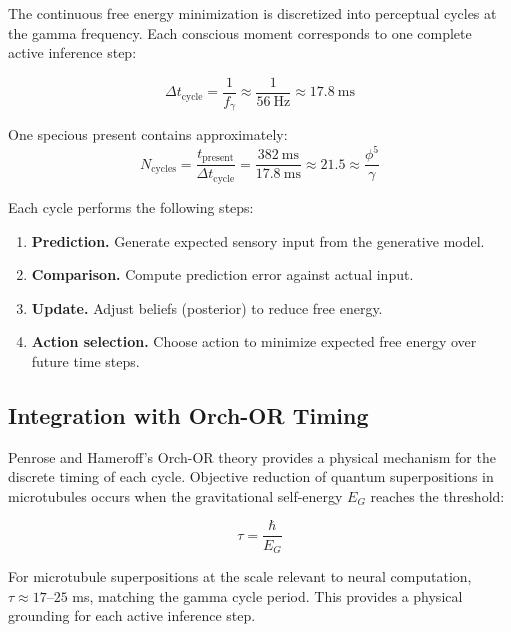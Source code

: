 \documentclass[12pt,a4paper]{article}
\begin{document}
The continuous free energy minimization is discretized into perceptual cycles
at the gamma frequency. Each conscious moment corresponds to one complete
active inference step:

\begin{equation}
\Delta t_{\mathrm{cycle}} = \frac{1}{f_\gamma} \approx \frac{1}{56~\text{Hz}}
\approx 17.8~\text{ms}
\end{equation}

\noindent
One specious present contains approximately:
\begin{equation}
N_{\mathrm{cycles}} = \frac{t_{\mathrm{present}}}{\Delta t_{\mathrm{cycle}}}
= \frac{382~\text{ms}}{17.8~\text{ms}} \approx 21.5 \approx \frac{\phi^5}{\gamma}
\end{equation}

\noindent
Each cycle performs the following steps:
\begin{enumerate}[leftmargin=2em]
  \item \textbf{Prediction.} Generate expected sensory input from the
    generative model.
  \item \textbf{Comparison.} Compute prediction error against actual input.
  \item \textbf{Update.} Adjust beliefs (posterior) to reduce free energy.
  \item \textbf{Action selection.} Choose action to minimize expected free
    energy over future time steps.
\end{enumerate}

\subsection{Integration with Orch-OR Timing}

Penrose and Hameroff's Orch-OR theory \cite{Penrose2014} provides a physical
mechanism for the discrete timing of each cycle. Objective reduction of
quantum superpositions in microtubules occurs when the gravitational
self-energy $E_G$ reaches the threshold:

\begin{equation}
\tau = \frac{\hbar}{E_G}
\end{equation}

\noindent
For microtubule superpositions at the scale relevant to neural computation,
$\tau \approx 17$--$25$ ms, matching the gamma cycle period. This provides
a physical grounding for each active inference step.

\end{document}
